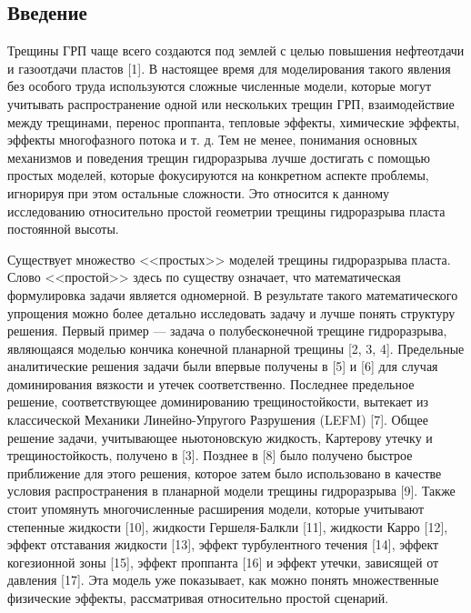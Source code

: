 \documentclass[a4paper, 12pt]{article}
\begin{document}
\subsection{Введение}

Трещины ГРП чаще всего создаются под землей с целью повышения нефтеотдачи и газоотдачи пластов [1].
В настоящее время для моделирования такого явления без особого труда используются сложные численные модели, которые могут учитывать распространение одной или нескольких трещин ГРП, взаимодействие между трещинами, перенос проппанта, тепловые эффекты, химические эффекты, эффекты многофазного потока и т. д.
Тем не менее, понимания основных механизмов и поведения трещин гидроразрыва лучше достигать с помощью простых моделей, которые фокусируются на конкретном аспекте проблемы, игнорируя при этом остальные сложности.
Это относится к данному исследованию относительно простой геометрии трещины гидроразрыва пласта постоянной высоты.

Существует множество <<простых>> моделей трещины гидроразрыва пласта.
Слово <<простой>> здесь по существу означает, что математическая формулировка задачи является одномерной.
В результате такого математического упрощения можно более детально исследовать задачу и лучше понять структуру решения.
Первый пример — задача о полубесконечной трещине гидроразрыва, являющаяся моделью кончика конечной планарной трещины [2, 3, 4].
Предельные аналитические решения задачи были впервые получены в [5] и [6] для случая доминирования вязкости и утечек соответственно.
Последнее предельное решение, соответствующее доминированию трещиностойкости, вытекает из классической Механики Линейно-Упругого Разрушения (LEFM) [7].
Общее решение задачи, учитывающее ньютоновскую жидкость, Картерову утечку и трещиностойкость, получено в [3].
Позднее в [8] было получено быстрое приближение для этого решения, которое затем было использовано в качестве условия распространения в планарной модели трещины гидроразрыва [9].
Также стоит упомянуть многочисленные расширения модели, которые учитывают степенные жидкости [10], жидкости Гершеля-Балкли [11], жидкости Карро [12], эффект отставания жидкости [13], эффект турбулентного течения [14], эффект когезионной зоны [15], эффект проппанта [16] и эффект утечки, зависящей от давления [17].
Эта модель уже показывает, как можно понять множественные физические эффекты, рассматривая относительно простой сценарий.
\end{document}
